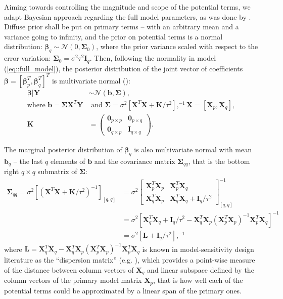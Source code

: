 Aiming towards controlling the magnitude and scope of the potential terms, we adapt Bayesian approach regarding the full model parameters, as was done by \cite{DuMouchel1994}.  Diffuse prior shall be put on primary terms -- with an arbitrary mean and a variance going to infinity, and the prior on potential terms is a normal distribution: $\bm{\beta}_q\sim\mathcal{N}(0,\bm{\Sigma}_{0})$, where the prior variance scaled with respect to the error variation:
$\bm{\Sigma}_{0}=\sigma^{2}\tau^{2}\bm{I}_{q}$. Then, following the normality in model (\ref{eq::full_model}), the posterior distribution of the joint vector of  coefficients $\bm{\beta}  = [\bm{\beta}^T_p, \bm{\beta}^T_q]^T$ is multivariate normal (\cite{Koch2007introduction}):
\begin{align*}
\bm{\beta}|\bm{Y} &\sim \mathcal{N}(\bm{b},\bm{\Sigma}), \\
\mbox{where } \bm{b} = \bm{\Sigma X}^T\bm{Y} &\mbox{ and }  \bm{\Sigma} = \sigma^{2}[\bm{X}^T\bm{X} + \bm{K}/\tau^{2}],^{-1}  \bm{X}=[\bm{X}_p, \bm{X}_q],\\
\bm{K} &= \begin{pmatrix}
\bm{0}_{p\times p} & \bm{0}_{p\times q}\\
\bm{0}_{q\times p} & \bm{I}_{q\times q}
\end{pmatrix}.
\end{align*}

The marginal posterior distribution of $\bm{\beta}_q$ is also multivariate normal with mean $\bm{b}_q$ -- the last $q$ elements of $\bm{b}$ and the covariance matrix $\bm{\Sigma}_{qq}$, that is the bottom right $q \times q $ submatrix of $\bm{\Sigma}$:
\begin{align*}
\bm{\Sigma}_{qq} = \sigma^{2}[(\bm{X}^T\bm{X} +  \bm{K}/\tau^{2})^{-1}]_{[q,q]} &= 
\sigma^{2}\begin{bmatrix}
\bm{X}^T_p\bm{X}_p& \bm{X}^T_p\bm{X}_q \\
\bm{X}^T_q\bm{X}_p& \bm{X}^T_q\bm{X}_q+\bm{I}_{q}/\tau^{2}
\end{bmatrix}^{-1}_{[q,q]}\\&=
\sigma^{2}[\bm{X}^T_q\bm{X}_q+\bm{I}_{q}/\tau^{2}-\bm{X}^T_q\bm{X}_p(\bm{X}^T_p\bm{X}_p)^{-1}\bm{X}^T_p\bm{X}_q]^{-1}\\&=\sigma^{2}\left[\bm{L}+\bm{I}_{q}/\tau^{2}\right],^{-1}
\end{align*} 
where $\bm{L} = \bm{X}^T_q\bm{X}_q-\bm{X}^T_q\bm{X}_p(\bm{X}^T_p\bm{X}_p)^{-1}\bm{X}^T_p\bm{X}_q$ is known in model-sensitivity design literature as the ``dispersion matrix'' (e.g. \cite{Goos2005model}), which provides a point-wise measure of the distance between column vectors of $\bm{X}_q$ and linear subspace defined by the column vectors of the primary model matrix $\bm{X}_p$, that is how well each of the potential terms could be approximated by a linear span of the primary ones.

